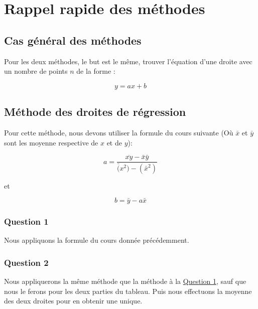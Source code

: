 \documentclass[letter]{article}
\date{\today}
\title{}
\begin{document}





\setcounter{tocdepth}{2}
\tableofcontents

\newpage

\section{Rappel rapide des méthodes}
\label{sec:org680d651}


\subsection{Cas général des méthodes}
\label{sec:orgd65ecb2}

Pour les deux méthodes, le but est le même, trouver l'équation d'une droite avec un nombre de points \(n\) de la forme :


\[ y= ax + b  \]




\subsection{Méthode des droites de régression}
\label{sec:org821102c}

Pour cette méthode, nous devons utiliser la formule du cours suivante (Où \(\bar{x}\) et \(\bar{y}\) sont les moyenne respective de \(x\) et de \(y\)):

\[ a =\frac{\overline{xy}-\bar{x}\bar{y}}{\bar(x^2)-(\bar{x}^2)}  \]


et

\[ b= \bar{y}-a\bar{x}  \]



\subsubsection{Question 1}
\label{sec:org9a25397}

Nous appliquons la formule du cours donnée précédemment.


\subsubsection{Question 2}
\label{sec:org217d3c1}

Nous appliquerons la même méthode que la méthode à la \hyperref[sec:org9a25397]{Question 1}, sauf que nous le ferons pour les deux parties du tableau.
Puis nous effectuons la moyenne des deux droites pour en obtenir une unique.
\end{document}
